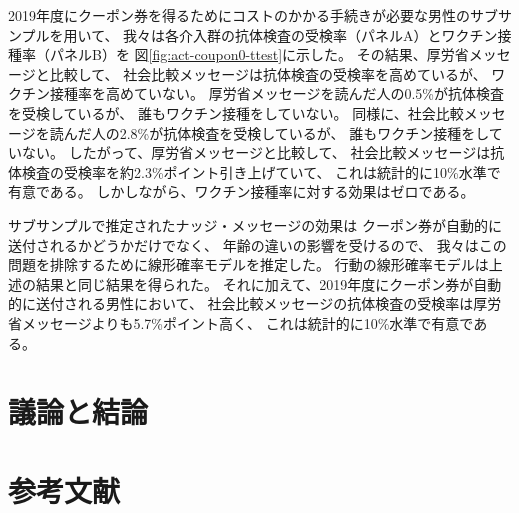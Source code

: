 \documentclass[
  11pt,
  a4paper,
]{article}
\begin{document}
2019年度にクーポン券を得るためにコストのかかる手続きが必要な男性のサブサンプルを用いて、
我々は各介入群の抗体検査の受検率（パネルA）とワクチン接種率（パネルB）を
図\ref{fig:act-coupon0-ttest}に示した。
その結果、厚労省メッセージと比較して、
社会比較メッセージは抗体検査の受検率を高めているが、
ワクチン接種率を高めていない。
厚労省メッセージを読んだ人の0.5\%が抗体検査を受検しているが、
誰もワクチン接種をしていない。
同様に、社会比較メッセージを読んだ人の2.8\%が抗体検査を受検しているが、
誰もワクチン接種をしていない。
したがって、厚労省メッセージと比較して、
社会比較メッセージは抗体検査の受検率を約2.3\%ポイント引き上げていて、
これは統計的に10\%水準で有意である。
しかしながら、ワクチン接種率に対する効果はゼロである。

サブサンプルで推定されたナッジ・メッセージの効果は
クーポン券が自動的に送付されるかどうかだけでなく、
年齢の違いの影響を受けるので、
我々はこの問題を排除するために線形確率モデルを推定した。
行動の線形確率モデルは上述の結果と同じ結果を得られた。
それに加えて、2019年度にクーポン券が自動的に送付される男性において、
社会比較メッセージの抗体検査の受検率は厚労省メッセージよりも5.7\%ポイント高く、
これは統計的に10\%水準で有意である。

\hypertarget{conclusion}{%
\section{議論と結論}\label{conclusion}}

\newpage

\hypertarget{ux53c2ux8003ux6587ux732e}{%
\section*{参考文献}\label{ux53c2ux8003ux6587ux732e}}
\end{document}
